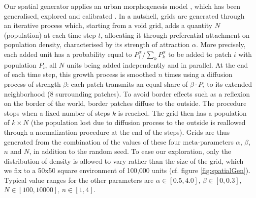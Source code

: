 \documentclass[Royal,sageh,times]{sagej}
\begin{document}
Our spatial generator applies an urban morphogenesis model \cite{Batty2007}, which has been generalised, explored and calibrated \cite{2017arXiv170806743R}. In a nutshell, grids are generated through an iterative process which, starting from a void grid, adds a quantity $N$ (population) at each time step $t$, allocating it through preferential attachment on population density, characterised by its strength of attraction $\alpha$. More precisely, each added unit has a probability equal to $P_i^{\alpha}/\sum_k P_k^{\alpha}$ to be added to patch $i$ with population $P_i$, all $N$ units being added independently and in parallel. At the end of each time step, this growth process is smoothed $n$ times using a diffusion process of strength $\beta$: each patch transmits an equal share of $\beta\cdot P_i$ to its extended neighborhood (8 surrounding patches). To avoid border effects such as a reflexion on the border of the world, border patches diffuse to the outside. The procedure stops when a fixed number of steps $k$ is reached. The grid then has a population of $k \times N$ (the population lost due to diffusion process to the outside is reallowed through a normalization procedure at the end of the steps). Grids are thus generated from the combination of the values of these four meta-parameters $\alpha$, $\beta$, $n$ and $N$, in addition to the random seed. To ease our exploration, only the distribution of density is allowed to vary rather than the size of the grid, which we fix to a 50x50 square environment of 100,000 units (cf. figure \ref{fig:spatialGen}). Typical value ranges for the other parameters are $\alpha\in\left[0.5,4.0\right]$, $\beta \in\left[0,0.3\right] $, $N\in \left[100,10000\right]$, $n\in\left[1,4\right]$.
 
\end{document}
